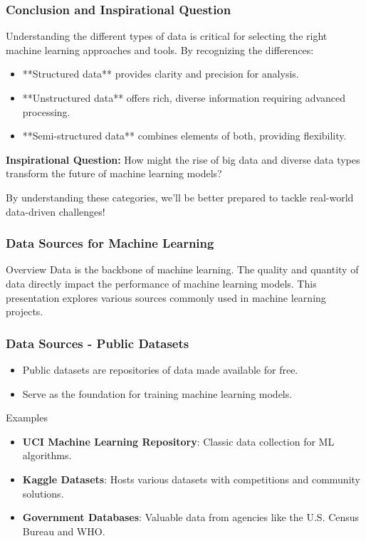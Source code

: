 \documentclass[aspectratio=169]{beamer}
\begin{document}
\begin{frame}[fragile]
    \frametitle{Conclusion and Inspirational Question}
    Understanding the different types of data is critical for selecting the right machine learning approaches and tools. By recognizing the differences:
    \begin{itemize}
        \item **Structured data** provides clarity and precision for analysis.
        \item **Unstructured data** offers rich, diverse information requiring advanced processing.
        \item **Semi-structured data** combines elements of both, providing flexibility.
    \end{itemize}
    \textbf{Inspirational Question:} How might the rise of big data and diverse data types transform the future of machine learning models?

    By understanding these categories, we'll be better prepared to tackle real-world data-driven challenges!
\end{frame}

\begin{frame}[fragile]
    \frametitle{Data Sources for Machine Learning}
    \begin{block}{Overview}
        Data is the backbone of machine learning. The quality and quantity of data directly impact the performance of machine learning models. This presentation explores various sources commonly used in machine learning projects.
    \end{block}
\end{frame}

\begin{frame}[fragile]
    \frametitle{Data Sources - Public Datasets}
    \begin{itemize}
        \item Public datasets are repositories of data made available for free.
        \item Serve as the foundation for training machine learning models.
    \end{itemize}
    
    \begin{block}{Examples}
        \begin{itemize}
            \item \textbf{UCI Machine Learning Repository}: Classic data collection for ML algorithms.
            \item \textbf{Kaggle Datasets}: Hosts various datasets with competitions and community solutions.
            \item \textbf{Government Databases}: Valuable data from agencies like the U.S. Census Bureau and WHO.
        \end{itemize}
    \end{block}
\end{frame}
\end{document}

